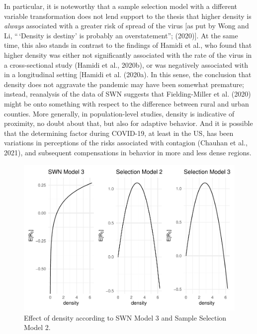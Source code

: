 \documentclass[]{elsarticle} %
\begin{document}
In particular, it is noteworthy that a sample selection model with a
different variable transformation does not lend support to the thesis
that higher density is \emph{always} associated with a greater risk of
spread of the virus {[}as put by Wong and Li, ``\,`Density is destiny'
is probably an overstatement''; (2020){]}. At the same time, this also
stands in contrast to the findings of Hamidi et al., who found that
higher density was either not significantly associated with the rate of
the virus in a cross-sectional study (Hamidi et al., 2020b), or was
negatively associated with in a longitudinal setting {[}Hamidi et al.
(2020a). In this sense, the conclusion that density does not aggravate
the pandemic may have been somewhat premature; instead, reanalysis of
the data of SWN suggests that Fielding-Miller et al. (2020) might be
onto something with respect to the difference between rural and urban
counties. More generally, in population-level studies, density is
indicative of proximity, no doubt about that, but also for adaptive
behavior. And it is possible that the determining factor during
COVID-19, at least in the US, has been variations in perceptions of the
risks associated with contagion (Chauhan et al., 2021), and subsequent
compensations in behavior in more and less dense regions.

\begin{figure}
\includegraphics[width=1\linewidth]{R0-Density-Reanalysis_files/figure-latex/comparison-results-1} \caption{\label{fig:comparison-results}Effect of density according to SWN Model 3 and Sample Selection Model 2.}\label{fig:comparison-results}
\end{figure}
\end{document}
